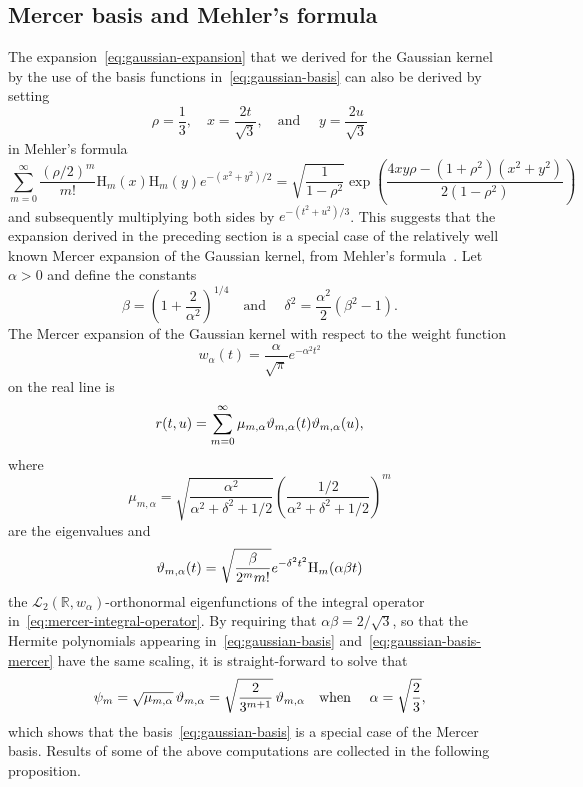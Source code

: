 \documentclass{article}
\newcommand{\tmcolor}[2]{{\color{#1}{#2}}}
\newcommand{\R}{\mathbb{R}}
\newcommand{\rev}[1]{\tmcolor{black}{#1}}
\begin{document}
\subsection{Mercer basis and Mehler's formula}

The expansion~\eqref{eq:gaussian-expansion} that we derived for the Gaussian
kernel by the use of the basis functions in~\eqref{eq:gaussian-basis} can also
be derived by setting
\[ \rho = \frac{1}{3}, \quad x = \frac{2 t}{\sqrt{3}}, \quad \text{and } \quad
   y = \frac{2 u}{\sqrt{3}} \]
in Mehler's formula
\[ \sum_{m = 0}^{\infty} \frac{(\rho / 2)^m}{m!} \mathrm{H}_m (x) \mathrm{H}_m
   (y) e^{- (x^2 + y^2) / 2} = \sqrt{\frac{1}{1 - \rho^2}} \exp \left( \frac{4
   xy \rho - (1 + \rho^2) (x^2 + y^2)}{2 (1 - \rho^2)} \right) \]
and subsequently multiplying both sides by $e^{- (t^2 + u^2) / 3}$. This
suggests that the expansion derived in the preceding section is a special case
of the relatively well known Mercer expansion of the Gaussian kernel,
{\rev{which can also be derived}} from Mehler's
formula~{\cite[Section~12.2.1]{FasshauerMcCourt2015}}. Let $\alpha > 0$ and
define the constants
\[ \beta = \left( 1 + \frac{2}{\alpha^2} \right)^{1 / 4}  \quad \text{and }
   \quad \delta^2 = \frac{\alpha^2}{2}  (\beta^2 - 1) . \]
The Mercer expansion of the Gaussian kernel with respect to the weight
function
\[ w_{\alpha} (t) = \frac{\alpha}{\sqrt{\pi}} e^{- \alpha^2 t^2} \]
on the real line is
\begin{equation}
  \label{eq:gaussian-mercer-expansion} r (t, u) = \sum_{m = 0}^{\infty}
  \mu_{m, \alpha} \rev{\vartheta}_{m, \alpha} (t) \rev{\vartheta}_{m, \alpha}
  (u),
\end{equation}
where
\[ \mu_{m, \alpha} = \sqrt{\frac{\alpha^2}{\alpha^2 + \delta^2 + 1 / 2}}
   \left( \frac{1 / 2}{\alpha^2 + \delta^2 + 1 / 2} \right)^m \]
are the eigenvalues and
\begin{equation}
  \label{eq:gaussian-basis-mercer} \rev{\vartheta}_{m, \alpha} (t) =
  \sqrt{\frac{\beta}{2^m m!}} e^{- \delta^2 t^2} \mathrm{H}_m (\alpha \beta t)
\end{equation}
the $\mathscr{L}_2 (\R, w_{\alpha})$-orthonormal eigenfunctions of the
integral operator in~\eqref{eq:mercer-integral-operator}. By requiring that
$\alpha \beta = 2 / \sqrt{3}$, so that the Hermite polynomials appearing
in~\eqref{eq:gaussian-basis} and~\eqref{eq:gaussian-basis-mercer} have the
same scaling, it is straight-forward to solve that
\[ \psi_m = \sqrt{\mu_{m, \alpha}} \hspace{0.17em} \rev{\vartheta}_{m, \alpha}
   = \sqrt{\frac{2}{3^{m + 1}}} \hspace{0.17em} \rev{\vartheta}_{m, \alpha}
   \quad \text{when } \quad \alpha = \sqrt{\frac{2}{3}}, \]
which shows that the basis~\eqref{eq:gaussian-basis} is a special case of the
Mercer basis. Results of some of the above computations are collected in the
following proposition.
\end{document}
